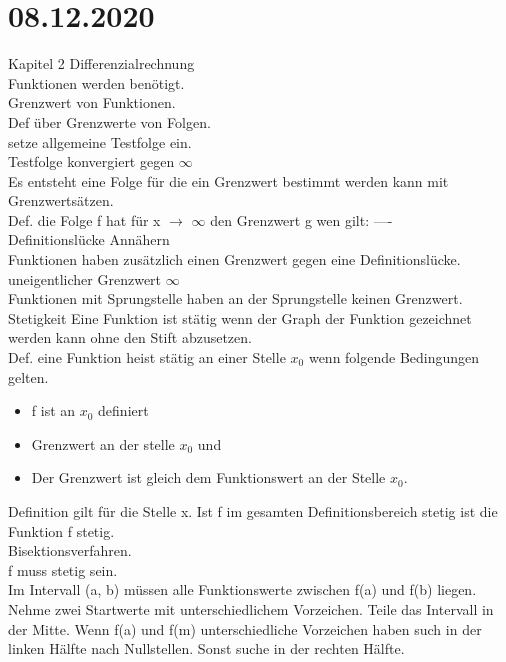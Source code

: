 \documentclass{article}
\begin{document}
	  \section*{08.12.2020}
	  Kapitel 2 Differenzialrechnung \\
	  Funktionen werden benötigt. \\
	  Grenzwert von Funktionen. \\
	  Def über Grenzwerte von Folgen. \\
	  setze allgemeine Testfolge ein. \\
	  Testfolge konvergiert gegen $\infty$ \\
	  Es entsteht eine Folge für die ein Grenzwert bestimmt werden kann mit Grenzwertsätzen. \\
	  Def. die Folge f hat für x  $\to$ $\infty$ den Grenzwert g wen gilt: ---- \\
	  Definitionslücke Annähern \\
	  Funktionen haben zusätzlich einen Grenzwert gegen eine Definitionslücke. \\
	  uneigentlicher Grenzwert $\infty$ \\
	  Funktionen mit Sprungstelle haben an der Sprungstelle keinen Grenzwert. \\
	 Stetigkeit Eine Funktion ist stätig wenn der Graph der Funktion gezeichnet werden kann ohne den Stift abzusetzen. \\
	 Def. eine Funktion heist stätig an einer Stelle $x_{0}$ wenn folgende Bedingungen gelten. \\
	 \begin{itemize}
	 	\item f ist an $x_{0}$  definiert
	 	\item Grenzwert an der stelle $x_{0}$ und
	 	\item Der Grenzwert ist gleich dem Funktionswert an der Stelle $x_{0}$.
	 \end{itemize}
	Definition gilt für die Stelle x. Ist f im gesamten Definitionsbereich stetig ist die Funktion f stetig. \\
	Bisektionsverfahren. \\
	f muss stetig sein. \\
	Im Intervall (a, b) müssen alle Funktionswerte zwischen f(a) und f(b) liegen. \\
	Nehme zwei Startwerte mit unterschiedlichem Vorzeichen. Teile das Intervall in der Mitte.
	Wenn f(a) und f(m) unterschiedliche Vorzeichen haben such in der linken Hälfte nach Nullstellen. Sonst suche in der rechten Hälfte. \\
\end{document}
